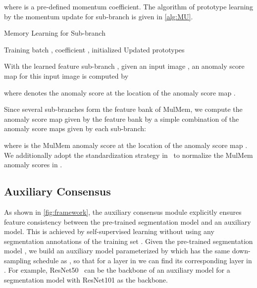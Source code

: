 \documentclass[10pt,twocolumn,letterpaper]{article}
\begin{document}
where  is a pre-defined momentum coefficient. The algorithm of prototype learning by the momentum update for sub-branch  is given in \cref{alg:MU}.







\begin{algorithm}[ht!]
\caption{Memory Learning for Sub-branch }
\label{alg:MU}
    \begin{algorithmic}[1]
    \REQUIRE Training batch , coefficient , initialized 
    \ENSURE Updated  prototypes 
\STATE 
        \STATE 
        \FOR {}
            \STATE 
            \STATE 
        \ENDFOR
\end{algorithmic}
\end{algorithm}


With the learned feature sub-branch , given an input image , an anomaly score map  for this input image is computed by

where  denotes the anomaly score at the location  of the anomaly score map .

Since several sub-branches form the feature bank  of MulMem, we compute the anomaly score map  given by the feature bank  by a simple combination of the anomaly score maps given by each sub-branch:

where  is the MulMem anomaly score at the location  of the anomaly score map . We additionally adopt the standardization strategy in~\cite{SML} to normalize the MulMem anomaly scores in .




















\subsection{Auxiliary Consensus}
\label{sec:cm}


As shown in \cref{fig:framework}, the auxiliary consensus module explicitly ensures feature consistency between the pre-trained segmentation model and an auxiliary model. This is achieved by self-supervised learning without using any segmentation annotations of the training set . Given the pre-trained segmentation model , we build an auxiliary model  parameterized by  which has the same down-sampling schedule as , so that for a layer  in  we can find its corresponding layer  in . For example, ResNet50~\cite{resnet} can be the backbone of an auxiliary model for a segmentation model with ResNet101 as the backbone.
\end{document}
